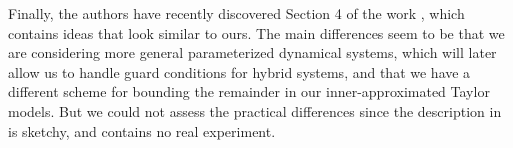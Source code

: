 \documentclass{sig-alternate-05-2015}
\newcommand\ForAuthors[1]%
 {\par\smallskip                     %
  \begin{center}%
   \fbox%
   {\parbox{0.9\linewidth}%
    {\raggedright\sc--- #1}%
   }%
  \end{center}%
  \par\smallskip                     %
 }
\begin{document}

Finally, the authors have recently discovered Section 4 of the work \cite{Gold06}, which
contains
ideas that look similar to ours. The main differences seem to be that we are considering more
general parameterized dynamical systems, which will later allow us to handle guard conditions for hybrid systems, 
and that we have a different scheme for bounding
the remainder in our inner-approximated Taylor models. But we could not assess the practical
differences since the description in \cite{Gold06} is sketchy, and contains no real experiment. 









\end{document}
